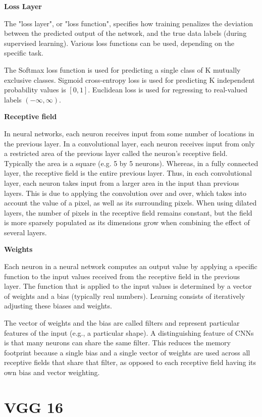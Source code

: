 \documentclass[10pt]{report}
\begin{document}
	\textbf{Loss Layer}

	The "loss layer", or "loss function", specifies how training penalizes the
	deviation between the predicted output of the network, and the true data
	labels (during supervised learning). Various loss functions can be used,
	depending on the specific task.

	The Softmax loss function is used for predicting a single class of K
	mutually exclusive classes. Sigmoid cross-entropy loss is used for
	predicting K independent probability values is $[0, 1]$.  Euclidean loss is
	used for regressing to real-valued labels $(- \infty, \infty)$.

	\textbf{Receptive field}

	In neural networks, each neuron receives input from some number of locations
	in the previous layer. In a convolutional layer, each neuron receives input
	from only a restricted area of the previous layer called the neuron's
	receptive field. Typically the area is a square (e.g. 5 by 5 neurons).
	Whereas, in a fully connected layer, the receptive field is the entire
	previous layer. Thus, in each convolutional layer, each neuron takes input
	from a larger area in the input than previous layers. This is due to
	applying the convolution over and over, which takes into account the value
	of a pixel, as well as its surrounding pixels. When using dilated layers,
	the number of pixels in the receptive field remains constant, but the field
	is more sparsely populated as its dimensions grow when combining the effect
	of several layers.

	\textbf{Weights}

	Each neuron in a neural network computes an output value by applying a
	specific function to the input values received from the receptive field in
	the previous layer. The function that is applied to the input values is
	determined by a vector of weights and a bias (typically real numbers).
	Learning consists of iteratively adjusting these biases and weights.

	The vector of weights and the bias are called filters and represent
	particular features of the input (e.g., a particular shape). A
	distinguishing feature of CNNs is that many neurons can share the same
	filter. This reduces the memory footprint because a single bias and a single
	vector of weights are used across all receptive fields that share that
	filter, as opposed to each receptive field having its own bias and vector
	weighting.

	\section{VGG 16}
\end{document}
